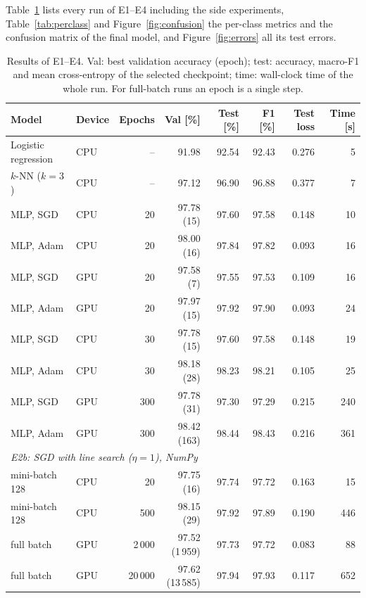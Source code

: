 \documentclass[11pt,a4paper]{article}
\newcommand{\1}{\mathbf{1}}
\begin{document}
Table~\ref{tab:results} lists every run of E1--E4 including the side experiments, Table~\ref{tab:perclass} and Figure~\ref{fig:confusion} the per-class metrics and the
confusion matrix of the final model, and Figure~\ref{fig:errors} all its test errors.

\begin{table}[tbp]
  \centering
  \small
  \setlength{\tabcolsep}{4pt}
  \caption{Results of E1--E4. Val: best validation accuracy (epoch); test: accuracy, macro-F1
    and mean cross-entropy of the selected checkpoint; time: wall-clock time of the whole run.
    For full-batch runs an epoch is a single step.}
  \label{tab:results}
  \begin{tabular}{llrrrrrr}
    \toprule
    Model & Device & Epochs & Val [\%] & Test [\%] & F1 [\%] & Test loss & Time [s] \\
    \midrule
    Logistic regression & CPU & -- & 91.98 & 92.54 & 92.43 & 0.276 & 5 \\
    $k$-NN ($k = 3$) & CPU & -- & 97.12 & 96.90 & 96.88 & 0.377 & 7 \\
    \midrule
    MLP, SGD & CPU & 20 & 97.78 (15) & 97.60 & 97.58 & 0.148 & 10 \\
    MLP, Adam & CPU & 20 & 98.00 (16) & 97.84 & 97.82 & 0.093 & 16 \\
    MLP, SGD & GPU & 20 & 97.58 (7) & 97.55 & 97.53 & 0.109 & 16 \\
    MLP, Adam & GPU & 20 & 97.97 (15) & 97.92 & 97.90 & 0.093 & 24 \\
    \midrule
    MLP, SGD & CPU & 30 & 97.78 (15) & 97.60 & 97.58 & 0.148 & 19 \\
    MLP, Adam & CPU & 30 & 98.18 (28) & 98.23 & 98.21 & 0.105 & 25 \\
    MLP, SGD & GPU & 300 & 97.78 (31) & 97.30 & 97.29 & 0.215 & 240 \\
    MLP, Adam & GPU & 300 & 98.42 (163) & 98.44 & 98.43 & 0.216 & 361 \\
    \midrule
    \multicolumn{8}{l}{\emph{E2b: SGD with line search ($\eta = 1$), NumPy}} \\
    mini-batch 128 & CPU & 20 & 97.75 (16) & 97.74 & 97.72 & 0.163 & 15 \\
    mini-batch 128 & CPU & 500 & 98.15 (29) & 97.92 & 97.89 & 0.190 & 446 \\
    full batch & GPU & 2\,000 & 97.52 (1\,959) & 97.73 & 97.72 & 0.083 & 88 \\
    full batch & GPU & 20\,000 & 97.62 (13\,585) & 97.94 & 97.93 & 0.117 & 652 \\

\end{tabular}
\end{table}
\end{document}
